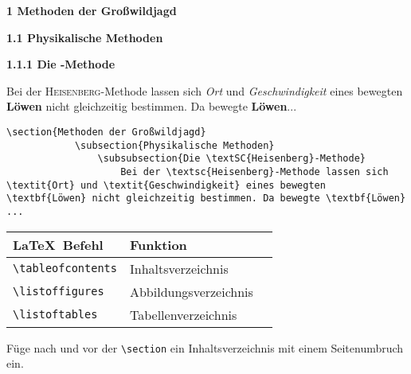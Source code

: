 \begin{frame}[fragile]
	\Losung
	\begin{outputbox}
		{ \LARGE\textbf{1 Methoden der Großwildjagd}} 
		
		{ \Large\textbf{1.1 Physikalische Methoden}}
		
		{ \large\textbf{1.1.1 Die -Methode}}
		
		Bei der \textsc{Heisenberg}-Methode lassen sich \textit{Ort} und \textit{Geschwindigkeit} eines bewegten \textbf{Löwen} nicht gleichzeitig bestimmen. Da bewegte \textbf{Löwen}...
	\end{outputbox}
	
	\Code
	\begin{lstlisting}[gobble=8]
		\section{Methoden der Großwildjagd}
			\subsection{Physikalische Methoden}
				\subsubsection{Die \textSC{Heisenberg}-Methode}	
					Bei der \textsc{Heisenberg}-Methode lassen sich \textit{Ort} und \textit{Geschwindigkeit} eines bewegten \textbf{Löwen} nicht gleichzeitig bestimmen. Da bewegte \textbf{Löwen} ...
	\end{lstlisting}
\end{frame}
\begin{frame}[fragile]
	\begin{center}
		\begin{tabular}{lll}
			\toprule
			\LaTeX\ Befehl					&	Funktion				\\ \midrule
			\lstinline|\tableofcontents|	&	Inhaltsverzeichnis		\\
			\lstinline|\listoffigures|		&	Abbildungsverzeichnis	\\
			\lstinline|\listoftables| 		&	Tabellenverzeichnis		\\ \bottomrule
		\end{tabular}
	\end{center}
	\pause\btVFill
	\Aufgabee
	Füge nach \lstinline[basicstyle=\normalfont\ttfamily\normalsize]|| und vor der \lstinline[basicstyle=\normalfont\ttfamily\normalsize]|\section| ein Inhaltsverzeichnis mit einem Seitenumbruch ein.
	\vspace{1.3cm}
\end{frame}
